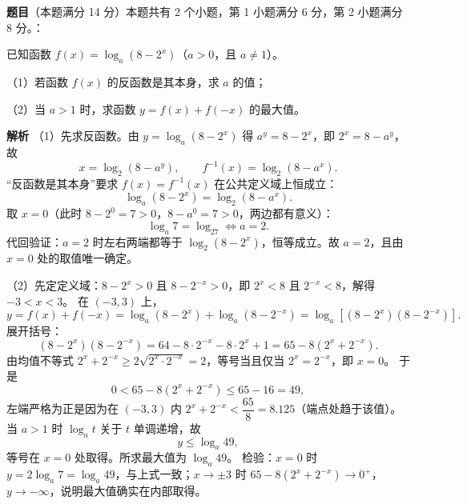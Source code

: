 \begin{answer}

\textbf{题目}（本题满分 14 分）本题共有 2 个小题，第 1 小题满分 6 分，第 2 小题满分 8 分。：

已知函数 $f(x)=\log_a(8-2^x)$（$a>0$，且 $a\neq1$）。

（1）若函数 $f(x)$ 的反函数是其本身，求 $a$ 的值；

（2）当 $a>1$ 时，求函数 $y=f(x)+f(-x)$ 的最大值。

\textbf{解析}
（1）先求反函数。由 $y=\log_a\left(8-2^x\right)$ 得 $a^y=8-2^x$，即 $2^x=8-a^y$，故
\nopagebreak[4]
\[x=\log_2\left(8-a^y\right),\qquad f^{-1}(x)=\log_2\left(8-a^x\right).\]
“反函数是其本身”要求 $f(x)=f^{-1}(x)$ 在公共定义域上恒成立：
\nopagebreak[4]
\[\log_a\left(8-2^x\right)=\log_2\left(8-a^x\right).\]
取 $x=0$（此时 $8-2^0=7>0$，$8-a^0=7>0$，两边都有意义）：
\nopagebreak[4]
\[\log_a7=\log_27\iff a=2.\]
代回验证：$a=2$ 时左右两端都等于 $\log_2\left(8-2^x\right)$，恒等成立。故 $a=2$，且由 $x=0$ 处的取值唯一确定。

（2）先定定义域：$8-2^x>0$ 且 $8-2^{-x}>0$，即 $2^x<8$ 且 $2^{-x}<8$，解得 $-3<x<3$。
在 $(-3,3)$ 上，
\nopagebreak[4]
\[y=f(x)+f(-x)=\log_a\left(8-2^x\right)+\log_a\left(8-2^{-x}\right)=\log_a\left[\left(8-2^x\right)\left(8-2^{-x}\right)\right].\]
展开括号：
\nopagebreak[4]
\[\left(8-2^x\right)\left(8-2^{-x}\right)=64-8\cdot2^{-x}-8\cdot2^x+1=65-8\left(2^x+2^{-x}\right).\]
由均值不等式 $2^x+2^{-x}\ge2\sqrt{2^x\cdot2^{-x}}=2$，等号当且仅当 $2^x=2^{-x}$，即 $x=0$。
于是
\nopagebreak[4]
\[0<65-8\left(2^x+2^{-x}\right)\le65-16=49,\]
左端严格为正是因为在 $(-3,3)$ 内 $2^x+2^{-x}<\dfrac{65}{8}=8.125$（端点处趋于该值）。
当 $a>1$ 时 $\log_a t$ 关于 $t$ 单调递增，故
\nopagebreak[4]
\[y\le\log_a49,\]
等号在 $x=0$ 处取得。所求最大值为 $\log_a49$。
检验：$x=0$ 时 $y=2\log_a7=\log_a49$，与上式一致；$x\to\pm3$ 时 $65-8\left(2^x+2^{-x}\right)\to0^+$，$y\to-\infty$，说明最大值确实在内部取得。


\end{answer}
